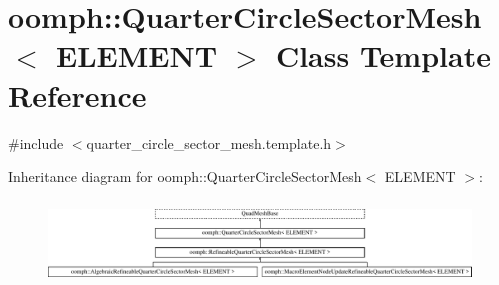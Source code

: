 \hypertarget{classoomph_1_1QuarterCircleSectorMesh}{}\section{oomph\+:\+:Quarter\+Circle\+Sector\+Mesh$<$ E\+L\+E\+M\+E\+NT $>$ Class Template Reference}
\label{classoomph_1_1QuarterCircleSectorMesh}


{\ttfamily \#include $<$quarter\+\_\+circle\+\_\+sector\+\_\+mesh.\+template.\+h$>$}

Inheritance diagram for oomph\+:\+:Quarter\+Circle\+Sector\+Mesh$<$ E\+L\+E\+M\+E\+NT $>$\+:\begin{figure}[H]
\begin{center}
\leavevmode
\includegraphics[height=2.235529cm]{classoomph_1_1QuarterCircleSectorMesh}
\end{center}
\end{figure}
